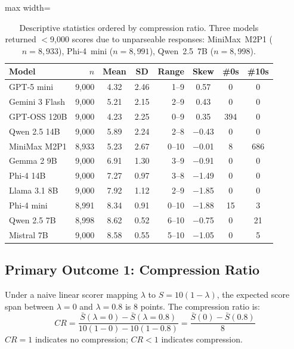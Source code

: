 \documentclass[11pt]{article}
\begin{document}
\begin{table}[htbp]
\centering
\caption{Descriptive statistics ordered by compression ratio. Three
models returned $<$9{,}000 scores due to unparseable responses:
MiniMax~M2P1 ($n = 8{,}933$), Phi-4~mini ($n = 8{,}991$), Qwen~2.5~7B
($n = 8{,}998$).}
\label{tab:dist}
\small
\begin{adjustbox}{max width=\columnwidth}
\begin{tabular}{@{}lrccrccc@{}}
\toprule
\textbf{Model} & $n$ & \textbf{Mean} & \textbf{SD} & \textbf{Range} &
\textbf{Skew} & \textbf{\#0s} & \textbf{\#10s} \\
\midrule
GPT-5 mini      & 9{,}000 & 4.32 & 2.46 & 1--9  &  0.57  & 0   & 0   \\
Gemini 3 Flash  & 9{,}000 & 5.21 & 2.15 & 2--9  &  0.43  & 0   & 0   \\
GPT-OSS 120B    & 9{,}000 & 4.23 & 2.25 & 0--9  &  0.35  & 394 & 0   \\
Qwen 2.5 14B    & 9{,}000 & 5.89 & 2.24 & 2--8  & $-$0.43 & 0   & 0   \\
MiniMax M2P1    & 8{,}933 & 5.23 & 2.67 & 0--10 & $-$0.01 & 8   & 686 \\
Gemma 2 9B      & 9{,}000 & 6.91 & 1.30 & 3--9  & $-$0.91 & 0   & 0   \\
Phi-4 14B       & 9{,}000 & 7.27 & 0.97 & 3--8  & $-$1.49 & 0   & 0   \\
Llama 3.1 8B    & 9{,}000 & 7.92 & 1.12 & 2--9  & $-$1.85 & 0   & 0   \\
Phi-4 mini      & 8{,}991 & 8.34 & 0.91 & 0--10 & $-$1.88 & 15  & 3   \\
Qwen 2.5 7B     & 8{,}998 & 8.62 & 0.52 & 6--10 & $-$0.75 & 0   & 21  \\
Mistral 7B      & 9{,}000 & 8.58 & 0.55 & 5--10 & $-$1.05 & 0   & 5   \\
\bottomrule
\end{tabular}
\end{adjustbox}
\end{table}

\subsection{Primary Outcome 1: Compression Ratio}

Under a naive linear scorer mapping $\lambda$ to $S = 10(1 - \lambda)$,
the expected score span between $\lambda = 0$ and $\lambda = 0.8$ is
8 points. The compression ratio is:
\begin{equation}
    \mathit{CR} = \frac{\bar{S}(\lambda = 0) - \bar{S}(\lambda =
    0.8)}{10(1 - 0) - 10(1 - 0.8)} = \frac{\bar{S}(0) -
    \bar{S}(0.8)}{8}
    \label{eq:compression}
\end{equation}
$\mathit{CR} = 1$ indicates no compression; $\mathit{CR} < 1$
indicates compression.
\end{document}
